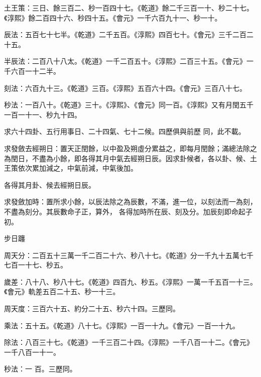 \begin{pinyinscope}
 土王策：三日、餘三百二、秒一百四十七。《乾道》餘二千三百一十、秒二十七。《淳熙》餘二百四十六、秒四十五。《會元》一千六百九十一、秒一十。



 辰法：五百七十七半。《乾道》二千五百。《淳熙》四百七十。《會元》三千二百二十五。



 半辰法：二百八十八太。《乾道》一千二百五十。《淳熙》二百三十五。《會元》一千六百一十二半。



 刻法：六百九十三。《乾道》三百。《淳熙》五百六十四。《會元》三百八十七。



 秒法：一百八十。《乾道》三十。《淳熙》、《會元》同一百。《淳熙》又有月閏五千一百一十一、秒九十四。



 求六十四卦、五行用事日、二十四氣、七十二候。四歷俱與前歷
 同，此不載。



 求發斂去經朔日：置天正閏餘，以中盈及朔虛分累益之，即每月閏餘；滿總法除之為閏日，不盡為小餘，即各得其月中氣去經朔日辰。因求卦候者，各以卦、候、土王策依次累加減之，中氣前減，中氣後加。



 各得其月卦、候去經朔日辰。



 求發斂加時：置所求小餘，以辰法除之為辰數，不滿，進一位，以刻法而一為刻，不盡為刻分。其辰數命子正，算外，
 各得加時所在辰、刻及分。加辰刻即命起子初。



 步日躔



 周天分：二百五十三萬一千二百二十六、秒八十七。《乾道》分一千九十五萬七千七百一十七、秒五。



 歲差：八十八、秒八十七。《乾道》四百九、秒五。《淳熙》一萬一千五百一十三。《會元》軌差五百二十五、秒一十三。



 周天度：三百六十五、約分二十五、秒六十四。三歷同。



 乘法：五十五。《乾道》八十七。《淳熙》一百一十九。《會元》一百一十九。



 除法：八百三十七。《乾道》一千三百二十四。《淳熙》一千八百一十二。《會元》一千八百一十一。



 秒法：一
 百。三歷同。




\end{pinyinscope}
